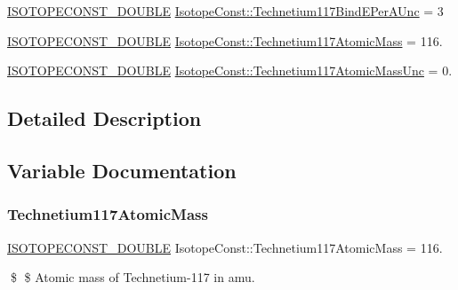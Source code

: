 \begin{DoxyCompactItemize}
\mbox{\hyperlink{group___isotope_const-_macros_ga8f45a7272ce02c0b4c65c44636ed719a}{I\+S\+O\+T\+O\+P\+E\+C\+O\+N\+S\+T\+\_\+\+D\+O\+U\+B\+LE}} \mbox{\hyperlink{group___isotope_const-_technetium-_tc117_ga25f58ef5a7fe6e13fc08090ab7d6ce2f}{Isotope\+Const\+::\+Technetium117\+Bind\+E\+Per\+A\+Unc}} = 3
\item 
\mbox{\hyperlink{group___isotope_const-_macros_ga8f45a7272ce02c0b4c65c44636ed719a}{I\+S\+O\+T\+O\+P\+E\+C\+O\+N\+S\+T\+\_\+\+D\+O\+U\+B\+LE}} \mbox{\hyperlink{group___isotope_const-_technetium-_tc117_ga73156c11895748ee652c8e30f96d2bda}{Isotope\+Const\+::\+Technetium117\+Atomic\+Mass}} = 116.
\item 
\mbox{\hyperlink{group___isotope_const-_macros_ga8f45a7272ce02c0b4c65c44636ed719a}{I\+S\+O\+T\+O\+P\+E\+C\+O\+N\+S\+T\+\_\+\+D\+O\+U\+B\+LE}} \mbox{\hyperlink{group___isotope_const-_technetium-_tc117_gace9b01324a2be312f48467f249e752e1}{Isotope\+Const\+::\+Technetium117\+Atomic\+Mass\+Unc}} = 0.
\end{DoxyCompactItemize}


\subsection{Detailed Description}


\subsection{Variable Documentation}
\mbox{\label{group___isotope_const-_technetium-_tc117_ga73156c11895748ee652c8e30f96d2bda}} 
\subsubsection{\texorpdfstring{Technetium117\+Atomic\+Mass}{Technetium117AtomicMass}}
{\footnotesize\ttfamily \mbox{\hyperlink{group___isotope_const-_macros_ga8f45a7272ce02c0b4c65c44636ed719a}{I\+S\+O\+T\+O\+P\+E\+C\+O\+N\+S\+T\+\_\+\+D\+O\+U\+B\+LE}} Isotope\+Const\+::\+Technetium117\+Atomic\+Mass = 116.}

\$ \$ Atomic mass of Technetium-\/117 in amu. \mbox{\label{group___isotope_const-_technetium-_tc117_gace9b01324a2be312f48467f249e752e1}} 
